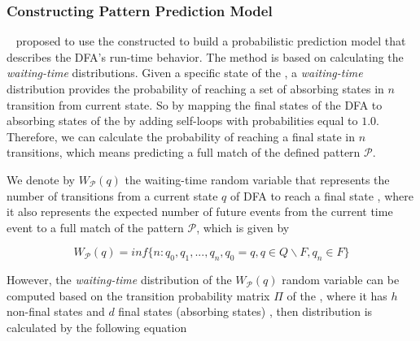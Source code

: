 

\subsubsection*{Constructing Pattern Prediction Model}
\label{sec:pmc_prediction}

~\citet{alevizos2017event} proposed to use the constructed \pmcmr to build a probabilistic prediction model that describes the DFA's run-time behavior. The method is based on calculating the \textit{waiting-time} distributions. Given a specific state of the \pmcmr, a \textit{waiting-time} distribution provides the probability of reaching a set of absorbing states in $n$ transition from current state. So by mapping the final states of the DFA to absorbing states of the \pmcmr by adding self-loops with probabilities equal to $1.0$. Therefore, we can calculate the probability of reaching a final state in $n$ transitions,  which means predicting a full match of the defined pattern $\mathcal{P}$.

\par We denote by $W_{\mathcal{P}}(q)$  the waiting-time random variable that represents the
number of transitions from a current state $q$ of DFA to reach a final state \cite{alevizos2017event}, where it also represents the expected number of future events from the current time event to  a full match of the pattern $\mathcal{P}$, which is given by 

\begin{equation*}
W_{\mathcal{P}}(q)=inf\{n: q_{0},q_{1},...,q_{n}, q_{0}=q, q \in Q \backslash F, q_{n} \in F\}
\end{equation*}

However, the \textit{waiting-time} distribution of the $W_{\mathcal{P}}(q)$ random variable can be computed based on the transition probability matrix $\Pi$ of the \pmcmr, where it has $h$ non-final states and $d$ final states (absorbing states) \cite{alevizos2017event}, then distribution is calculated by the following equation 

